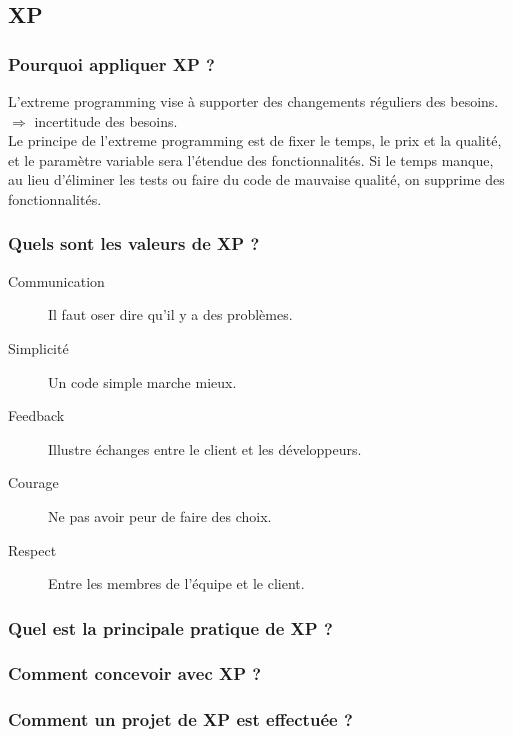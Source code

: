 \subsection{XP}



\subsubsection{Pourquoi appliquer XP ?}
L’extreme programming vise à supporter des changements réguliers des besoins.\\
$\Rightarrow$ incertitude des besoins.\\
Le principe de l’extreme programming est de fixer le temps, le prix et la qualité, et le paramètre variable sera l’étendue des fonctionnalités. Si le temps manque, au lieu d’éliminer les tests ou faire du code de mauvaise qualité, on supprime des fonctionnalités.



\subsubsection{Quels sont les valeurs de XP ?}
\begin{description}
	\item [Communication] Il faut oser dire qu’il y a des problèmes.
	\item [Simplicité] Un code simple marche mieux.
	\item [Feedback] Illustre échanges entre le client et les développeurs.
	\item [Courage] Ne pas avoir peur de faire des choix.
	\item [Respect] Entre les membres de l’équipe et le client.
\end{description}



\subsubsection{Quel est la principale pratique de XP ?}



\subsubsection{Comment concevoir avec XP ?}



\subsubsection{Comment un projet de XP est effectuée ?}
